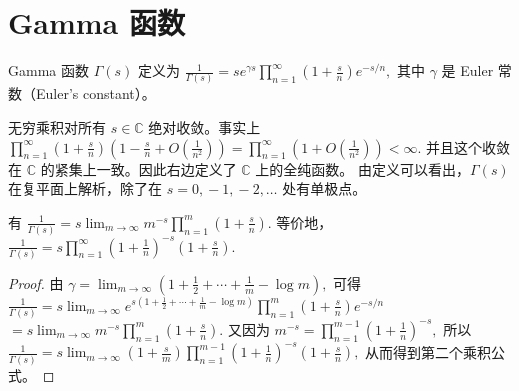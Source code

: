 \chapter{Gamma 函数}
\label{chap:gamma-function}

\begin{definition}
	Gamma 函数 $\Gamma(s)$ 定义为
	\(\textstyle \frac{1}{\Gamma(s)} =\allowbreak{} s e^{\gamma s} \prod_{n=\allowbreak{}1}^\infty \left(1+\allowbreak{}\frac{s}{n}\right)e^{-s/n},\allowbreak{}\)
	其中 $\gamma$ 是 Euler 常数（Euler's constant）。
\end{definition}

\begin{remark}
	无穷乘积对所有 $s\in\mathbb C$ 绝对收敛。事实上
	\(\textstyle \prod_{n=\allowbreak{}1}^\infty \left(1+\allowbreak{}\frac{s}{n}\right) \left(1-\frac{s}{n}+\allowbreak{}O\left(\frac{1}{n^2}\right)\right) =\allowbreak{} \prod_{n=\allowbreak{}1}^\infty \left(1+\allowbreak{}O\left(\frac{1}{n^2}\right)\right)<\infty.\)
	并且这个收敛在 $\mathbb C$ 的紧集上一致。因此右边定义了 $\mathbb C$ 上的全纯函数。
	由定义可以看出，$\Gamma(s)$ 在复平面上解析，除了在
	\(\textstyle s=\allowbreak{}0,\allowbreak{}-1,\allowbreak{}-2,\allowbreak{}\ldots\)
	处有单极点。
\end{remark}

\begin{theorem}
	有
	\(\textstyle \frac{1}{\Gamma(s)} =\allowbreak{} s\lim_{m\to\allowbreak{}\infty} m^{-s}\prod_{n=\allowbreak{}1}^{m}\left(1+\allowbreak{}\frac{s}{n}\right).\)
	等价地，
	\(\textstyle \frac{1}{\Gamma(s)} =\allowbreak{} s\prod_{n=\allowbreak{}1}^{\infty} \left(1+\allowbreak{}\frac{1}{n}\right)^{-s} \left(1+\allowbreak{}\frac{s}{n}\right).\)
\end{theorem}

\begin{proof}
	由
	\(\textstyle \gamma=\allowbreak{}\lim_{m\to\allowbreak{}\infty} \left(1+\allowbreak{}\frac12+\allowbreak{}\cdots+\allowbreak{}\frac1m-\log m\right),\allowbreak{}\)
	可得
	\(\textstyle \frac{1}{\Gamma(s)} =\allowbreak{} s\lim_{m\to\allowbreak{}\infty} e^{s(1+\allowbreak{}\frac12+\allowbreak{}\cdots+\allowbreak{}\frac1m-\log m)} \prod_{n=\allowbreak{}1}^{m} \left(1+\allowbreak{}\frac{s}{n}\right)e^{-s/n}\) \(\textstyle =\allowbreak{} s\lim_{m\to\allowbreak{}\infty} m^{-s}\prod_{n=\allowbreak{}1}^{m}\left(1+\allowbreak{}\frac{s}{n}\right).\)
	又因为
	\(\textstyle m^{-s} =\allowbreak{} \prod_{n=\allowbreak{}1}^{m-1} \left(1+\allowbreak{}\frac1n\right)^{-s},\allowbreak{}\)
	所以
	\(\textstyle \frac{1}{\Gamma(s)} =\allowbreak{} s\lim_{m\to\allowbreak{}\infty} \left(1+\allowbreak{}\frac{s}{m}\right) \prod_{n=\allowbreak{}1}^{m-1} \left(1+\allowbreak{}\frac1n\right)^{-s} \left(1+\allowbreak{}\frac{s}{n}\right),\allowbreak{}\)
	从而得到第二个乘积公式。
\end{proof}

